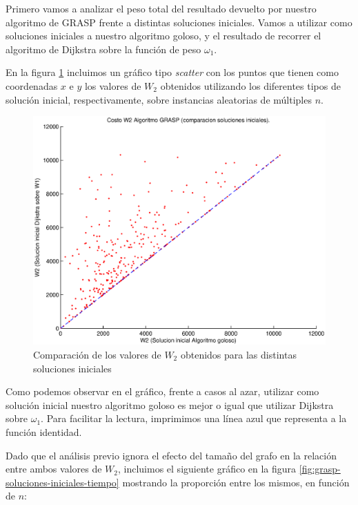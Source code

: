 Primero vamos a analizar el peso total del resultado devuelto por nuestro algoritmo de GRASP frente a distintas soluciones iniciales. Vamos a utilizar como soluciones iniciales a nuestro algoritmo goloso, y el resultado de recorrer el algoritmo de Dijkstra sobre la función de peso $\omega_1$.

En la figura \ref{fig:grasp-soluciones-iniciales} incluimos un gráfico tipo \emph{scatter} con los puntos que tienen como coordenadas $x$ e $y$ los valores de $W_2$ obtenidos utilizando los diferentes tipos de solución inicial, respectivamente, sobre instancias aleatorias de múltiples $n$.

\begin{figure}[H]
  \begin{center}
    \begin{minipage}{0.7\linewidth}
      \includegraphics[width=\linewidth]{graficos/grasp_comparacion_soluciones_iniciales.eps}
      \caption{Comparación de los valores de $W_2$ obtenidos para las distintas soluciones iniciales}\label{fig:grasp-soluciones-iniciales}
    \end{minipage}
  \end{center}
\end{figure}

Como podemos observar en el gráfico, frente a casos al azar, utilizar como solución inicial nuestro algoritmo goloso es mejor o igual que utilizar Dijkstra sobre $\omega_1$. Para facilitar la lectura, imprimimos una línea azul que representa a la función identidad.

Dado que el análisis previo ignora el efecto del tamaño del grafo en la relación entre ambos valores de $W_2$, incluimos el siguiente gráfico en la figura \ref{fig:grasp-soluciones-iniciales-tiempo} mostrando la proporción entre los mismos, en función de $n$:


